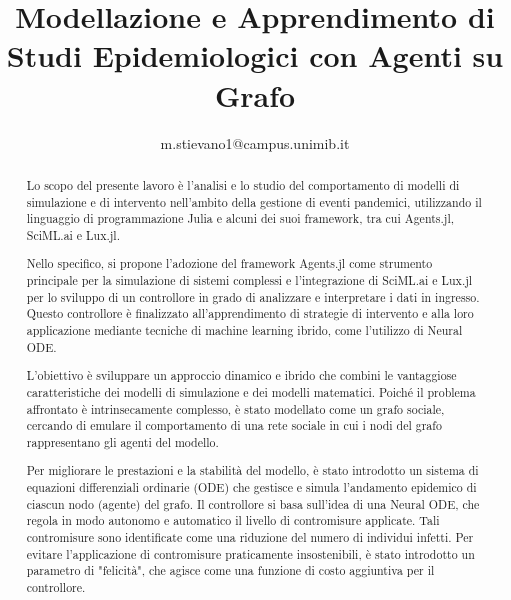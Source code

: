 \documentclass[11pt,a4paper]{article}
\title{Modellazione e Apprendimento di Studi Epidemiologici con Agenti su Grafo}
\author{m.stievano1@campus.unimib.it}
\begin{document}


\begin{abstract}
    Lo scopo del presente lavoro è l'analisi e lo studio del comportamento 
    di modelli di simulazione e di intervento nell'ambito della gestione 
    di eventi pandemici, utilizzando il linguaggio di programmazione Julia 
    e alcuni dei suoi framework, tra cui Agents.jl, SciML.ai e Lux.jl.

    Nello specifico, si propone l'adozione del framework Agents.jl come 
    strumento principale per la simulazione di sistemi complessi e 
    l'integrazione di SciML.ai e Lux.jl per lo sviluppo di un controllore 
    in grado di analizzare e interpretare i dati in ingresso. 
    Questo controllore è finalizzato all'apprendimento di strategie di 
    intervento e alla loro applicazione mediante tecniche di machine 
    learning ibrido, come l'utilizzo di Neural ODE.
    
    L'obiettivo è sviluppare un approccio dinamico e ibrido che combini 
    le vantaggiose caratteristiche dei modelli di simulazione e dei 
    modelli matematici. Poiché il problema affrontato è intrinsecamente 
    complesso, è stato modellato come un grafo sociale, 
    cercando di emulare il comportamento di una rete sociale in cui i 
    nodi del grafo rappresentano gli agenti del modello.
    
    Per migliorare le prestazioni e la stabilità del modello, è stato 
    introdotto un sistema di equazioni differenziali ordinarie (ODE) 
    che gestisce e simula l'andamento epidemico di ciascun nodo (agente) 
    del grafo. Il controllore si basa sull'idea di una Neural ODE, 
    che regola in modo autonomo e automatico il livello di contromisure 
    applicate. Tali contromisure sono identificate come una riduzione 
    del numero di individui infetti. Per evitare l'applicazione di 
    contromisure praticamente insostenibili, è stato introdotto un 
    parametro di "felicità", che agisce come una funzione di costo 
    aggiuntiva per il controllore.
\end{abstract}


\tableofcontents
\newpage
\listoffigures
\listoftables
\newpage








\end{document}

